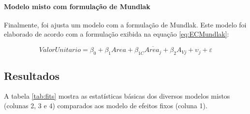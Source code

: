 \documentclass[
  a4paper, 11pt]{article}
\begin{document}
\hypertarget{modelo-misto-com-formulauxe7uxe3o-de-mundlak}{%
\paragraph{Modelo misto com formulação de
Mundlak}\label{modelo-misto-com-formulauxe7uxe3o-de-mundlak}}

Finalmente, foi ajusta um modelo com a formulação de Mundlak. Este
modelo foi elaborado de acordo com a formulação exibida na equação
\ref{eq:ECMundlak}:

\begin{equation} \label{eq:ECMundlak}
ValorUnitario = \beta_0 + \beta_1 Area + \beta_{1C} \overline{Area_j} + \beta_2 A_{Vj} + \upsilon_j + \varepsilon
\end{equation}

\hypertarget{resultados}{%
\subsection{Resultados}\label{resultados}}

A tabela \ref{tab:fits} mostra as estatísticas básicas dos diversos
modelos mistos (colunas 2, 3 e 4) comparados aos modelo de efeitos fixos
(coluna 1).
\end{document}
